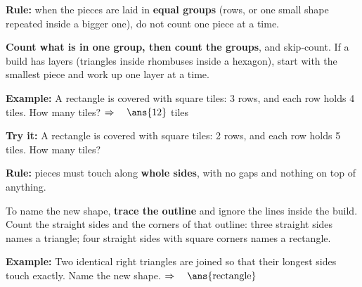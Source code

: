 \documentclass[12pt]{article}
\begin{document}


\begin{formulabox}
\textbf{Rule:} when the pieces are laid in \textbf{equal groups} (rows, or one small
shape repeated inside a bigger one), do not count one piece at a time.\par
\smallskip
\textbf{Count what is in one group, then count the groups}, and skip-count. If a build
has layers (triangles inside rhombuses inside a hexagon), start with the smallest piece
and work up one layer at a time.
\end{formulabox}

\begin{examplebox}
\textbf{Example:} \quad A rectangle is covered with square tiles: 3 rows, and each row
holds 4 tiles. How many tiles?
$\Rightarrow\quad \ans{12}$ tiles
\end{examplebox}

\begin{tryitbox}
\textbf{Try it:} \quad A rectangle is covered with square tiles: 2 rows, and each row
holds 5 tiles. How many tiles?\\[2pt]
\end{tryitbox}


\begin{formulabox}
\textbf{Rule:} pieces must touch along \textbf{whole sides}, with no gaps and nothing
on top of anything.\par
\smallskip
To name the new shape, \textbf{trace the outline} and ignore the lines inside the build.
Count the straight sides and the corners of that outline: three straight sides names a
triangle; four straight sides with square corners names a rectangle.
\end{formulabox}

\begin{examplebox}
\textbf{Example:} \quad Two identical right triangles are joined so that their longest
sides touch exactly. Name the new shape.
$\Rightarrow\quad \ans{\text{rectangle}}$
\end{examplebox}
\end{document}

